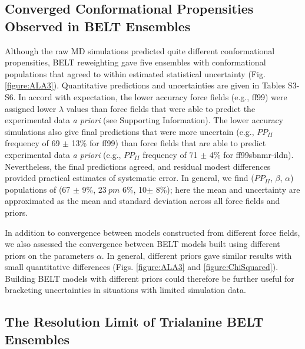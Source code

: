 \documentclass[journal=jacsat,manuscript=article]{achemso}
\begin{document}
\subsection*{Converged Conformational Propensities Observed in BELT Ensembles}

Although the raw MD simulations predicted quite different conformational propensities, BELT reweighting gave five ensembles with conformational populations that agreed to within estimated statistical uncertainty (Fig. \ref{figure:ALA3}).  Quantitative predictions and uncertainties are given in Tables S3-S6.  In accord with expectation, the lower accuracy force fields (e.g., ff99) were assigned lower $\lambda$ values than force fields that were able to predict the experimental data {\it a priori} (see Supporting Information). The lower accuracy simulations also give final predictions that were more uncertain (e.g., $PP_{II}$ frequency of 69 $\pm$ 13\% for ff99) than force fields that are able to predict experimental data {\it a priori} (e.g., $PP_{II}$ frequency of 71 $\pm$ 4\% for ff99sbnmr-ildn). Nevertheless, the final predictions agreed, and residual modest differences provided practical estimates of systematic error.  In general, we find ($PP_{II}$, $\beta$, $\alpha$) populations of (67 $\pm$ 9\%, 23$\
pm$ 6\%, 10$\pm$ 8\%); here the mean and uncertainty are approximated as the mean and standard deviation across all force fields and priors. 

In addition to convergence between models constructed from different force fields, we also assessed the convergence between BELT models built using different priors on the parameters $\alpha$.  In general, different priors gave similar results with small quantitative differences (Figs. \ref{figure:ALA3} and \ref{figure:ChiSquared}).  Building BELT models with different priors could therefore be further useful for bracketing uncertainties in situations with limited simulation data.  

\subsection*{The Resolution Limit of Trialanine BELT Ensembles}
\end{document}

